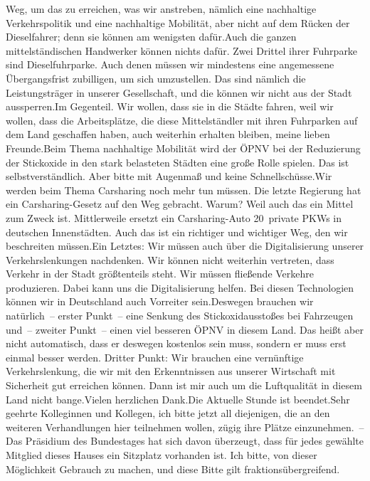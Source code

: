 \documentclass{article}
\begin{document}
Weg, um das zu erreichen, was wir anstreben, nämlich eine nachhaltige Verkehrspolitik und eine nachhaltige Mobilität, aber nicht auf dem Rücken der Dieselfahrer; denn sie können am wenigsten dafür.Auch die ganzen mittelständischen Handwerker können nichts dafür. Zwei Drittel ihrer Fuhrparke sind Dieselfuhrparke. Auch denen müssen wir mindestens eine angemessene Übergangsfrist zubilligen, um sich umzustellen. Das sind nämlich die Leistungsträger in unserer Gesellschaft, und die können wir nicht aus der Stadt aussperren.Im Gegenteil. Wir wollen, dass sie in die Städte fahren, weil wir wollen, dass die Arbeitsplätze, die diese Mittelständler mit ihren Fuhrparken auf dem Land geschaffen haben, auch weiterhin erhalten bleiben, meine lieben Freunde.Beim Thema nachhaltige Mobilität wird der ÖPNV bei der Reduzierung der Stickoxide in den stark belasteten Städten eine große Rolle spielen. Das ist selbstverständlich. Aber bitte mit Augenmaß und keine Schnellschüsse.Wir werden beim Thema Carsharing noch mehr tun müssen. Die letzte Regierung hat ein Carsharing-Gesetz auf den Weg gebracht. Warum? Weil auch das ein Mittel zum Zweck ist. Mittlerweile ersetzt ein Carsharing-Auto 20 private PKWs in deutschen Innenstädten. Auch das ist ein richtiger und wichtiger Weg, den wir beschreiten müssen.Ein Letztes: Wir müssen auch über die Digitalisierung unserer Verkehrslenkungen nachdenken. Wir können nicht weiterhin vertreten, dass Verkehr in der Stadt größtenteils steht. Wir müssen fließende Verkehre produzieren. Dabei kann uns die Digitalisierung helfen. Bei diesen Technologien können wir in Deutschland auch Vorreiter sein.Deswegen brauchen wir natürlich – erster Punkt – eine Senkung des Stickoxidausstoßes bei Fahrzeugen und – zweiter Punkt – einen viel besseren ÖPNV in diesem Land. Das heißt aber nicht automatisch, dass er deswegen kostenlos sein muss, sondern er muss erst einmal besser werden. Dritter Punkt: Wir brauchen eine vernünftige Verkehrslenkung, die wir mit den Erkenntnissen aus unserer Wirtschaft mit Sicherheit gut erreichen können. Dann ist mir auch um die Luftqualität in diesem Land nicht bange.Vielen herzlichen Dank.Die Aktuelle Stunde ist beendet.Sehr geehrte Kolleginnen und Kollegen, ich bitte jetzt all diejenigen, die an den weiteren Verhandlungen hier teilnehmen wollen, zügig ihre Plätze einzunehmen. – Das Präsidium des Bundestages hat sich davon überzeugt, dass für jedes gewählte Mitglied dieses Hauses ein Sitzplatz vorhanden ist. Ich bitte, von dieser Möglichkeit Gebrauch zu machen, und diese Bitte gilt fraktionsübergreifend.
\end{document}
